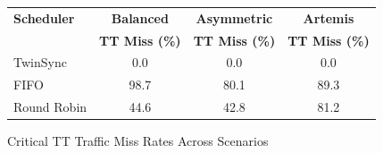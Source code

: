 
\begin{figure}[!t]
\centering
\footnotesize
\begin{tabular}{@{}lccc@{}}
\toprule
\textbf{Scheduler} & \textbf{Balanced} & \textbf{Asymmetric} & \textbf{Artemis} \\
& \textbf{TT Miss (\%)} & \textbf{TT Miss (\%)} & \textbf{TT Miss (\%)} \\
\midrule
TwinSync & 0.0 & 0.0 & 0.0 \\
FIFO & 98.7 & 80.1 & 89.3 \\
Round Robin & 44.6 & 42.8 & 81.2 \\
\bottomrule
\end{tabular}
\caption{Critical TT Traffic Miss Rates Across Scenarios}
\label{fig:tt_comparison}
\vspace{-0.3cm}
\end{figure}
